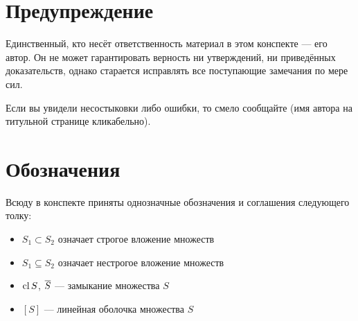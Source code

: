 \section*{Предупреждение}

Единственный, кто несёт ответственность материал в этом конспекте --- его автор. Он не может гарантировать верность ни утверждений, ни приведённых доказательств, однако старается исправлять все поступающие замечания по мере сил.

Если вы увидели несостыковки либо ошибки, то смело сообщайте (имя автора на титульной странице кликабельно).

\section*{Обозначения}

Всюду в конспекте приняты однозначные обозначения и соглашения следующего толку:

\begin{itemize}
	\item $S_1 \subset S_2$ означает строгое вложение множеств
	
	\item $S_1 \subseteq S_2$ означает нестрогое вложение множеств
	
	\item $\operatorname{cl} S$, $\overline{S}$ --- замыкание множества $S$
	
	\item $[S]$ --- линейная оболочка множества $S$
\end{itemize}